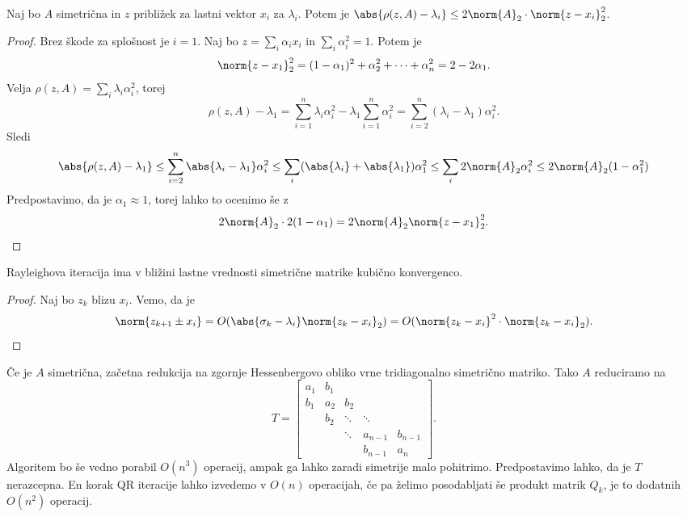 \begin{lema}
  Naj bo $A$ simetrična in $z$ približek za lastni vektor $x_i$ za $\lambda_i$.
  Potem je $\abs{\rho(z,A) - \lambda_i} \le 2 \norm{A}_2 \cdot \norm{z -
	x_i}_2^2$.
\end{lema}

\begin{proof}
  Brez škode za splošnost je $i = 1$.
  Naj bo $z = \sum_i \alpha_i x_i$ in $\sum_i \alpha_i^2 = 1$.
  Potem je
  \[
	\norm{z - x_1}_2^2 = (1 - \alpha_1)^2 + \alpha_2^2 + \cdots + \alpha_n^2
	= 2 - 2 \alpha_1.
  \]
  Velja $\rho(z, A) = \sum_i \lambda_i \alpha_i^2$, torej
  \[
	\rho(z, A) - \lambda_1
	= \sum_{i=1}^n \lambda_i \alpha_i^2 - \lambda_1 \sum_{i=1}^n \alpha_i^2
	= \sum_{i=2}^n (\lambda_i - \lambda_1) \alpha_i^2.
  \]
  Sledi
  \[
	\abs{\rho(z,A) - \lambda_1}
	\le \sum_{i=2}^n \abs{\lambda_i - \lambda_1} \alpha_i^2
	\le \sum_i (\abs{\lambda_i} + \abs{\lambda_1}) \alpha_1^2
	\le \sum_i 2 \norm{A}_2 \alpha_i^2
	\le 2 \norm{A}_2 (1 - \alpha_1^2)
  \]
  Predpostavimo, da je $\alpha_1 \approx 1$, torej lahko to ocenimo še z
  \[
	2 \norm{A}_2 \cdot 2 (1 - \alpha_1)
	= 2 \norm{A}_2 \norm{z - x_1}_2^2.
  \]
\end{proof}


\begin{izrek}
  Rayleighova iteracija ima v bližini lastne vrednosti simetrične matrike
  kubično konvergenco.
\end{izrek}

\begin{proof}
  Naj bo $z_k$ blizu $x_i$.
  Vemo, da je
  \[
	\norm{z_{k+1} \pm x_i} = O(\abs{\sigma_k - \lambda_i} \norm{z_k - x_i}_2)
	= O(\norm{z_k - x_i}^2 \cdot \norm{z_k - x_i}_2).
  \]
\end{proof}



Če je $A$ simetrična, začetna redukcija na zgornje Hessenbergovo obliko vrne
tridiagonalno simetrično matriko.
Tako $A$ reduciramo na
\[
  T =
  \begin{bmatrix}
	a_1 & b_1 & & & \\
	b_1 & a_2 & b_2 & & \\
		& b_2 & \ddots & \ddots & \\
		& & \ddots & a_{n-1} & b_{n-1} \\
	& & & b_{n-1} & a_n
  \end{bmatrix}.
\]
Algoritem bo še vedno porabil $O(n^3)$ operacij, ampak ga lahko zaradi simetrije
malo pohitrimo.
Predpostavimo lahko, da je $T$ nerazcepna.
En korak QR iteracije lahko izvedemo v $O(n)$ operacijah, če pa želimo
posodabljati še produkt matrik $Q_k$, je to dodatnih $O(n^2)$ operacij.


